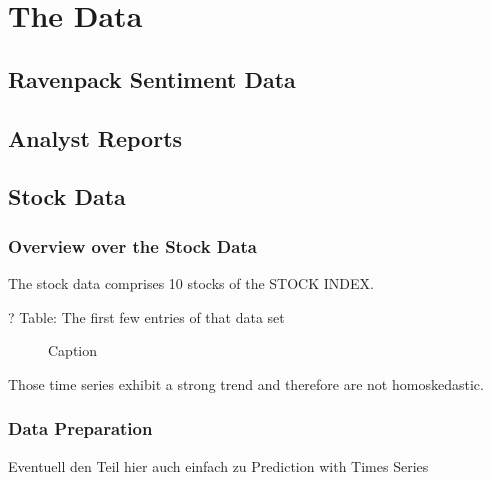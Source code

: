 \chapter{The Data}

\section{Ravenpack Sentiment Data}


\section{Analyst Reports}


\section{Stock Data}
\subsection{Overview over the Stock Data}
The stock data comprises 10 stocks of the STOCK INDEX. 

? Table: The first few entries of that data set

\begin{figure}[h]
    \centering
    \begin{adjustbox}{width=.9\textwidth,center}
    
    \end{adjustbox}  
    \caption{Caption}
    \label{fig:Daily Stock Prices for all Stocks in the Data Set}
\end{figure}{}

Those time series exhibit a strong trend and therefore are not homoskedastic. 




\subsection{Data Preparation}
Eventuell den Teil hier auch einfach zu Prediction with Times Series
